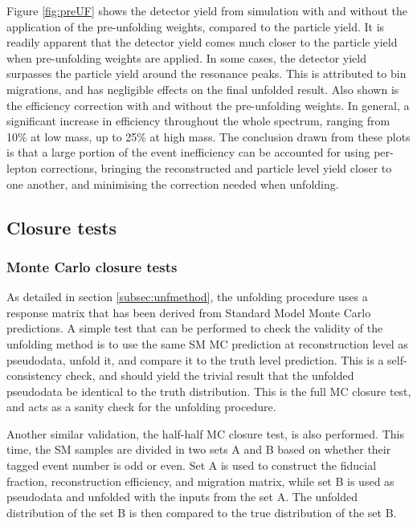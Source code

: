
Figure \ref{fig:preUF} shows the detector yield from simulation with and without the application of the pre-unfolding weights, compared to the particle yield. It is readily apparent that the detector yield comes much closer to the particle yield when pre-unfolding weights are applied. In some cases, the detector yield surpasses the particle yield around the resonance peaks. This is attributed to bin migrations, and has negligible effects on the final unfolded result. Also shown is the efficiency correction with and without the pre-unfolding weights. In general, a significant increase in efficiency throughout the whole \mFourL spectrum, ranging from 10\% at low mass, up to 25\% at high mass. The conclusion drawn from these plots is that a large portion of the event inefficiency can be accounted for using per-lepton corrections, bringing the reconstructed and particle level yield closer to one another, and minimising the correction needed when unfolding.

\subsection{Closure tests}
\label{sec:closuretests}
\subsubsection{Monte Carlo closure tests}

As detailed in section \ref{subsec:unfmethod}, the unfolding procedure uses a response matrix that has been derived from Standard Model Monte Carlo predictions. A simple test that can be performed to check the validity of the unfolding method is to use the same SM MC prediction at reconstruction level as pseudodata, unfold it, and compare it to the truth level prediction. This is a self-consistency check, and should yield the trivial result that the unfolded pseudodata be identical to the truth distribution. This is the full MC closure test, and acts as a sanity check for the unfolding procedure.

Another similar validation, the half-half MC closure test, is also performed. This time, the SM samples are divided in two sets A and B based on whether their tagged event number is odd or even. Set A is used to construct the fiducial fraction, reconstruction efficiency, and migration matrix, while set B is used as pseudodata and unfolded with the inputs from the set A. The unfolded distribution of the set B is then compared to the true distribution of the set B.

